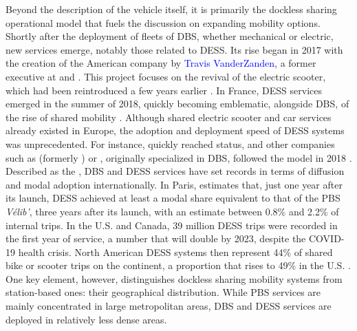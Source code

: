 \begin{refsegment}
Beyond the description of the vehicle itself, it is primarily the dockless sharing operational model that fuels the discussion on expanding mobility options. Shortly after the deployment of fleets of \acrshort{DBS}, whether mechanical or electric, new services emerge, notably those related to \acrfull{DESS}. Its rise began in 2017 with the creation of the American company  by \textcolor{blue}{Travis VanderZanden}, a former executive at  and  \textcolor{blue}{\autocite[13]{nlc_micromobility_2019}}. This project focuses on the revival of the electric scooter, which had been reintroduced a few years earlier \textcolor{blue}{\autocite{easy_electric_life_free_2020}}. In France, \acrshort{DESS} services emerged in the summer of 2018, quickly becoming emblematic, alongside \acrshort{DBS}, of the rise of shared mobility \textcolor{blue}{\autocite[1]{bortoli_consequential_2020}}. Although shared electric scooter and car services already existed in Europe, the adoption and deployment speed of \acrshort{DESS} systems was unprecedented. For instance,  quickly reached  status, and other companies such as  (formerly ) or , originally specialized in \acrshort{DBS}, followed the model in 2018 \textcolor{blue}{\autocite[4]{clewlow_micro-mobility_2018}}. Described as the  \textcolor{blue}{\autocite[1]{boffi_extrait_2019}}, \acrshort{DBS} and \acrshort{DESS} services have set records in terms of diffusion and modal adoption internationally. In Paris, \textcolor{blue}{\textcite[146]{6t-bureau_de_recherche_usages_2019}} estimates that, just one year after its launch, \acrshort{DESS} achieved at least a modal share equivalent to that of the \acrshort{PBS} \textsl{Vélib’}, three years after its launch, with an estimate between 0.8\% and 2.2\% of internal trips. In the U.S. and Canada, 39 million \acrshort{DESS} trips were recorded in the first year of service, a number that will double by 2023, despite the COVID-19 health crisis. North American \acrshort{DESS} systems then represent 44\% of shared bike or scooter trips on the continent, a proportion that rises to 49\% in the U.S. \textcolor{blue}{\autocites[10]{nacto_shared_2019}[10]{nacto_shared_2020}[3-5]{nacto_shared_2024}}. One key element, however, distinguishes dockless sharing mobility systems from station-based ones: their geographical distribution. While \acrshort{PBS} services are mainly concentrated in large metropolitan areas, \acrshort{DBS} and \acrshort{DESS} services are deployed in relatively less dense areas.%


\end{refsegment}
